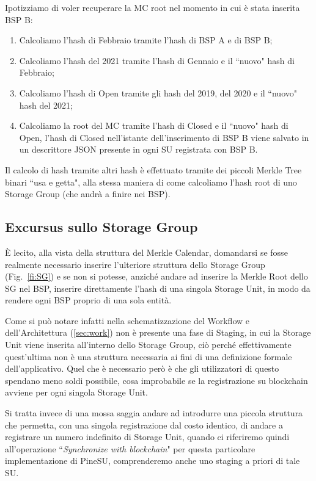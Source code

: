 Ipotizziamo di voler recuperare la MC root nel momento in cui è stata inserita BSP B:
\begin{enumerate}
    \item Calcoliamo l'hash di Febbraio tramite l'hash di BSP A e di BSP B;
    \item Calcoliamo l'hash del 2021 tramite l'hash di Gennaio e il ``nuovo" hash di Febbraio;
    \item Calcoliamo l'hash di Open tramite gli hash del 2019, del 2020 e il ``nuovo" hash del 2021;
    \item Calcoliamo la root del MC tramite l'hash di Closed e il ``nuovo" hash di Open, l'hash di Closed nell'istante dell'inserimento di BSP B viene salvato in un descrittore JSON presente in ogni SU registrata con BSP B.
\end{enumerate}
Il calcolo di hash tramite altri hash è effettuato tramite dei piccoli Merkle Tree binari ``usa e getta", alla stessa maniera di come calcoliamo l'hash root di uno Storage Group (che andrà a finire nei BSP).

\subsection{Excursus sullo Storage Group}
\label{sub:stage1}
È lecito, alla vista della struttura del Merkle Calendar, domandarsi se fosse realmente
necessario inserire l'ulteriore struttura dello Storage Group (Fig.~\ref{fi:SG}) e se non si potesse,
anziché andare ad inserire la Merkle Root dello SG nel BSP, inserire direttamente
l'hash di una singola Storage Unit, in modo da rendere ogni BSP proprio di una sola entità.

Come si può notare infatti nella schematizzazione del Workflow e dell'Architettura
(\autoref{sec:work}) non è presente una fase di Staging, in cui la Storage Unit viene
inserita all'interno dello Storage Group, ciò perché effettivamente quest'ultima non è
una struttura necessaria ai fini di una definizione formale dell'applicativo.
Quel che è necessario però è che gli utilizzatori di questo spendano meno soldi possibile,
cosa improbabile se la registrazione su blockchain avviene per ogni singola Storage Unit.

Si tratta invece di una mossa saggia andare ad introdurre una piccola struttura che permetta,
con una singola registrazione dal costo identico, di andare a registrare un numero
indefinito di Storage Unit, quando ci riferiremo quindi all'operazione
``\emph{Synchronize with blockchain}" per questa particolare implementazione di PineSU,
comprenderemo anche uno staging a priori di tale SU.

